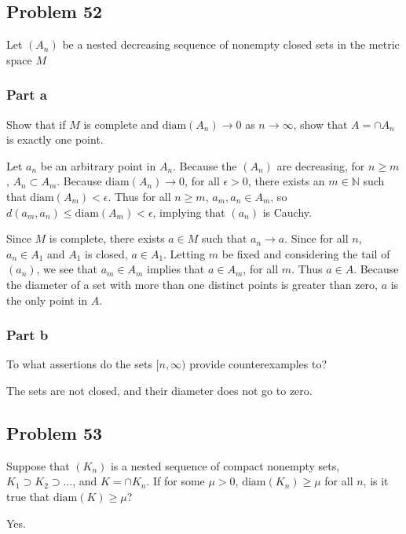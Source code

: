 \documentclass{article}
\newcommand{\diam}{\text{diam}}
\begin{document}
\subsection*{Problem 52}

Let $(A_n)$ be a nested decreasing sequence of nonempty closed sets in the metric space $M$

\subsubsection*{Part a}

Show that if $M$ is complete and $\text{diam}(A_n) \rightarrow 0$ as $n \rightarrow \infty$, show that $A = \cap A_n$ is exactly one point.

Let $a_n$ be an arbitrary point in $A_n$. Because the $(A_n)$ are decreasing, for $n \geq m$, $A_n \subset A_m$. Because $\text{diam}(A_n) \rightarrow 0$, for all $\epsilon > 0$, there exists an $m \in \mathbb{N}$ such that $\text{diam}(A_m) < \epsilon$. Thus for all $n \geq m$, $a_m, a_n \in A_m$, so $d(a_m, a_n) \leq \text{diam}(A_m) < \epsilon$, implying that $(a_n)$ is Cauchy.

Since $M$ is complete, there exists $a \in M$ such that $a_n \rightarrow a$. Since for all $n$, $a_n \in A_1$ and $A_1$ is closed, $a \in A_1$. Letting $m$ be fixed and considering the tail of $(a_n)$, we see that $a_m \in A_m$ implies that $a \in A_m$, for all $m$. Thus $a \in A$. Because the diameter of a set with more than one distinct points is greater than zero, $a$ is the only point in $A$.

\subsubsection*{Part b}

To what assertions do the sets $[n, \infty)$ provide counterexamples to?

The sets are not closed, and their diameter does not go to zero.

\subsection*{Problem 53}

Suppose that $(K_n)$ is a nested sequence of compact nonempty sets, $K_1 \supset K_2 \supset \dots $, and $K = \cap K_n$. If for some $\mu > 0$, $\diam(K_n) \geq \mu$ for all $n$, is it true that $\diam(K) \geq \mu$?

Yes.
\end{document}
